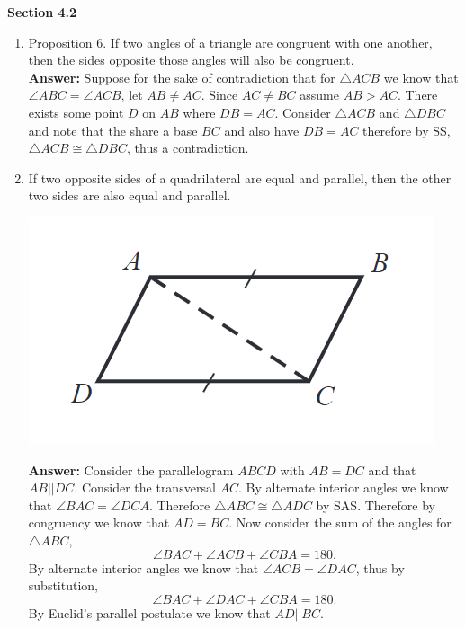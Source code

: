 \documentclass[12pt]{article}
\theoremstyle{homework}
\begin{document}
\textbf{Section 4.2}
\begin{enumerate}
\item Proposition 6. If two angles of a triangle are congruent with one another, then the sides opposite those angles will also be 
congruent.\\
 
\textbf{Answer:} Suppose for the sake of contradiction that for $\triangle ACB$ we know that $\angle ABC = \angle ACB$, let 
$AB \neq AC$. Since $AC \neq BC$ assume $AB > AC$. There exists some point $D$ on $AB$ where $DB = AC$. Consider $\triangle ACB$ and 
$\triangle DBC$ and note that the share a base $BC$ and also have $DB = AC$ therefore by SS, $\triangle ACB \cong \triangle DBC$, thus a contradiction. 
\vspace{.5in}

\setcounter{enumi}{6}
\item If two opposite sides of a quadrilateral are equal and parallel, then the other two sides are also equal and parallel.\\
\begin{center}
  \includegraphics[width = .50\textwidth]{parallel.png}
\end{center}
\textbf{Answer:} Consider the parallelogram $ABCD$ with $AB = DC$ and that $AB || DC$. Consider the transversal $AC$. By alternate interior angles
we know that $\angle BAC = \angle DCA$. Therefore $\triangle ABC \cong \triangle ADC$ by SAS. Therefore by congruency we know that $AD = BC$. Now consider the sum of
the angles for $\triangle ABC$,
\begin{equation*}
  \angle BAC + \angle ACB + \angle CBA = 180. 
\end{equation*} 
By alternate interior angles we know that $\angle ACB = \angle DAC$, thus by substitution, 
\begin{equation*}
  \angle BAC + \angle DAC + \angle CBA = 180.
\end{equation*}
By Euclid's parallel postulate we know that $AD || BC$. 
\vspace{.5in}


\setcounter{enumi}{11}



\end{enumerate}
\end{document}
